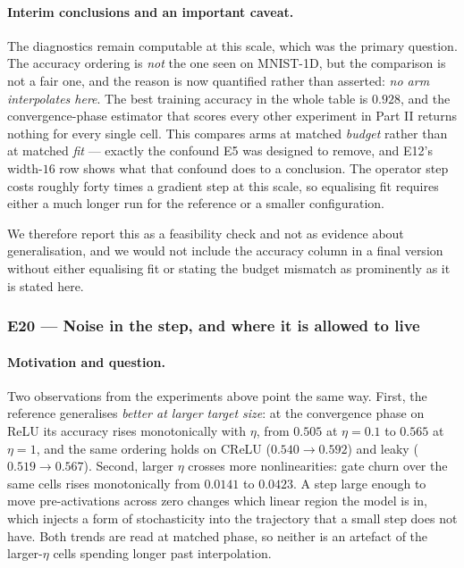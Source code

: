 \documentclass{article} %
\theoremstyle{plain}
\theoremstyle{definition}
\theoremstyle{remark}
\begin{document}
\paragraph{Interim conclusions and an important caveat.}
The diagnostics remain computable at this scale, which was the primary question. The accuracy
ordering is \emph{not} the one seen on MNIST-1D, but the comparison is not a fair one, and the
reason is now quantified rather than asserted: \emph{no arm interpolates here}. The best training
accuracy in the whole table is $0.928$, and the convergence-phase estimator that scores every other
experiment in Part II returns nothing for every single cell. This compares arms at matched
\emph{budget} rather than at matched \emph{fit} --- exactly the confound E5 was designed to remove,
and E12's width-$16$ row shows what that confound does to a conclusion. The operator step costs
roughly forty times a gradient step at this scale, so equalising fit requires either a much longer
run for the reference or a smaller configuration.

We therefore report this as a feasibility check and not as evidence about generalisation, and we
would not include the accuracy column in a final version without either equalising fit or stating
the budget mismatch as prominently as it is stated here.

\subsubsection{E20 --- Noise in the step, and where it is allowed to live}
\label{sec:e20}

\paragraph{Motivation and question.}
Two observations from the experiments above point the same way. First, the reference generalises
\emph{better at larger target size}: at the convergence phase on ReLU its accuracy rises
monotonically with $\eta$, from $0.505$ at $\eta = 0.1$ to $0.565$ at $\eta = 1$, and the same
ordering holds on CReLU ($0.540 \to 0.592$) and leaky ($0.519 \to 0.567$). Second, larger $\eta$
crosses more nonlinearities: gate churn over the same cells rises monotonically from $0.0141$ to
$0.0423$. A step large enough to move pre-activations across zero changes which linear region the
model is in, which injects a form of stochasticity into the trajectory that a small step does not
have. Both trends are read at matched phase, so neither is an artefact of the larger-$\eta$ cells
spending longer past interpolation.
\end{document}
